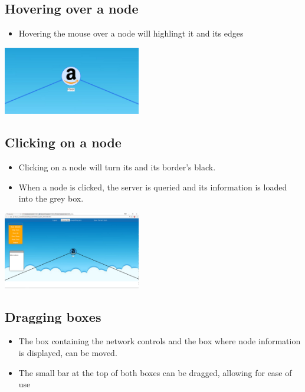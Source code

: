 \documentclass[hidelinks,a4paper,12pt]{article}
\begin{document}
			\subsection{Hovering over a node}
						\begin {itemize}
						\item Hovering the mouse over a node will highlingt it and its edges
					\end{itemize}
					
					\begin{center}
						\includegraphics[width=0.45\textwidth]{./images/NodeHover.png}
						
					\end{center}
		\newpage
		
		\subsection{Clicking on a node}
					\begin {itemize}
					\item Clicking on a node will turn its and its border's black.
					\item When a node is clicked, the server is queried and its information is loaded into the grey box.
				\end{itemize}
				
				\begin{center}
					\includegraphics[width=0.45\textwidth]{./images/SelectNode.png}
					
				\end{center}
		
		\subsection{Dragging boxes}
				\begin {itemize}
				\item The box containing the network controls and the box where node information is displayed, can be moved.
				\item The small bar at the top of both boxes can be dragged, allowing for ease of use
			\end{itemize}
			
\end{document}
